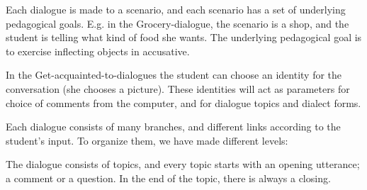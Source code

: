 \documentclass[11pt]{article}
\begin{document}
Each dialogue is made to a scenario, and each scenario has a set of underlying pedagogical goals. E.g. in the Grocery-dialogue, the scenario is a shop, and the student is telling what kind of food she wants. The underlying pedagogical goal is to exercise inflecting objects in accusative.


In the Get-acquainted-to-dialogues the student can choose an identity for the conversation (she chooses a picture). These identities will act as parameters for choice of comments from the computer, and for dialogue topics and dialect forms.

%	

Each dialogue consists of many branches, and different links according to the student's input. To organize them, we have made different levels:


The dialogue consists of topics, and every topic starts with an opening utterance; a comment or a question. In the end of the topic, there is always a closing.  
\end{document}

